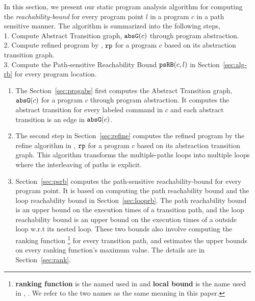 In this section, we present our static program analysis algorithm for computing 
the \emph{reachability-bound} for every program point $l$ in a program $c$ in a path sensitive manner.
%
The algorithm is summarized into the following steps,
%
\\
    1. Compute Abstract Transition graph, $\mathtt{abs}{\mathtt{G}}(c)$ through program abstraction.
    \\
    2. Compute refined program by \cite{GulwaniJK09}, $\mathtt{rp}$ for a program $c$ based on 
    its abstraction transition graph.
    \\
    3. Compute the Path-sensitive Reachability Bound $\mathtt{psRB}(c, l)$ in Section~\ref{sec:alg-rb} for every
    program location. 
%
\begin{enumerate}
\item  The Section~\ref{sec:progabs} first 
computes the Abstract Transition graph, $\mathtt{abs}{\mathtt{G}}(c)$ for a program $c$ through program abstraction.
It computes the abstract transition 
for every labeled command in $c$ and each abstract transition is an edge in $\mathtt{abs}{\mathtt{G}}(c)$.
\item The second step in Section~\ref{sec:refine}
computes the refined program by the refine algorithm in \cite{GulwaniJK09}, $\mathtt{rp}$ for a program $c$ based on 
its abstraction transition graph.
This algorithm transforms the multiple-paths loops
into multiple loops where
the interleaving of paths is explicit.
\item Section~\ref{sec:psrb} computes the path-sensitive reachability-bound for every program point.
It is based on computing the path reachability bound and the loop reachability bound
in Section~\ref{sec:looprb}.
The path reachability bound is an upper bound on the execution times of a transition path,
and
the loop reachability bound is an upper bound on the execution times of a outside loop 
w.r.t its nested loop. These two bounds also involve computing the ranking function  
\footnote{\textbf{ranking function} is the named used in \cite{SinnZV14}
and \textbf{local bound} is the name used in \cite{ZulegerGSV11}, \cite{sinn2017complexity}.
We refer to the two names as the same meaning in this paper.} 
for every transition path,
and estimates the upper bounds on every ranking function's maximum value. The details are in Section~\ref{sec:rank}.
\end{enumerate}
